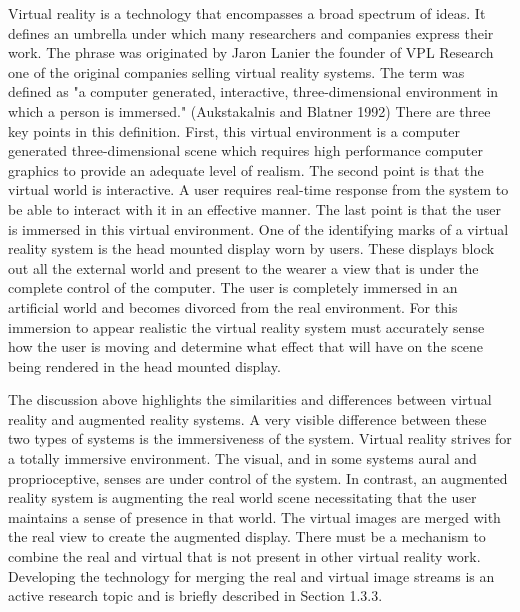 Virtual reality is a technology that encompasses a broad spectrum of ideas. It defines an umbrella under which many researchers and companies express their work. The phrase was originated by Jaron Lanier the founder of VPL Research one of the original companies selling virtual reality systems. The term was defined as "a computer generated, interactive, three-dimensional environment in which a person is immersed." (Aukstakalnis and Blatner 1992) There are three key points in this definition. First, this virtual environment is a computer generated three-dimensional scene which requires high performance computer graphics to provide an adequate level of realism. The second point is that the virtual world is interactive. A user requires real-time response from the system to be able to interact with it in an effective manner. The last point is that the user is immersed in this virtual environment. One of the identifying marks of a virtual reality system is the head mounted display worn by users. These displays block out all the external world and present to the wearer a view that is under the complete control of the computer. The user is completely immersed in an artificial world and becomes divorced from the real environment. For this immersion to appear realistic the virtual reality system must accurately sense how the user is moving and determine what effect that will have on the scene being rendered in the head mounted display.

The discussion above highlights the similarities and differences between virtual reality and augmented reality systems. A very visible difference between these two types of systems is the immersiveness of the system. Virtual reality strives for a totally immersive environment. The visual, and in some systems aural and proprioceptive, senses are under control of the system. In contrast, an augmented reality system is augmenting the real world scene necessitating that the user maintains a sense of presence in that world. The virtual images are merged with the real view to create the augmented display. There must be a mechanism to combine the real and virtual that is not present in other virtual reality work. Developing the technology for merging the real and virtual image streams is an active research topic and is briefly described in Section 1.3.3.


